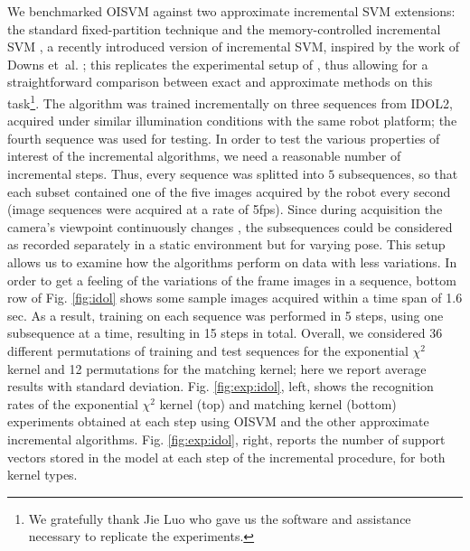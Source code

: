 We benchmarked OISVM against two approximate incremental SVM
extensions: the standard fixed-partition technique
\cite{syed99incremental} and the memory-controlled incremental SVM
\cite{pronobis:icvs06}, a recently introduced version of incremental
SVM, inspired by the work of Downs et~al. \cite{DownsGM01}; this
replicates the experimental setup of \cite{luo:icra07}, thus allowing
for a straightforward comparison between exact and approximate methods
on this task\footnote{We gratefully thank Jie Luo who gave us the
software and assistance necessary to replicate the experiments.}.  The
algorithm was trained incrementally on three sequences from IDOL2,
acquired under similar illumination conditions with the same robot
platform; the fourth sequence was used for testing. In order to test
the various properties of interest of the incremental algorithms, we
need a reasonable number of incremental steps.  Thus, every sequence
was splitted into $5$ subsequences, so that each subset contained one
of the five images acquired by the robot every second (image sequences
were acquired at a rate of 5fps). Since during acquisition the
camera's viewpoint continuously changes \cite{luo:icra07}, the
subsequences could be considered as recorded separately in a static
environment but for varying pose.  This setup allows us to examine how
the algorithms perform on data with less variations. In order to get a
feeling of the variations of the frame images in a sequence, bottom
row of Fig. \ref{fig:idol} shows some sample images acquired within a
time span of 1.6 sec. As a result, training
on each sequence was performed in 5 steps, using one subsequence at a
time, resulting in 15 steps in total. Overall, we considered 36
different permutations of training and test sequences for the
exponential $\chi^2$ kernel and 12 permutations for the matching
kernel; here we report average results with standard
deviation. Fig. \ref{fig:exp:idol}, left, shows the recognition rates
of the exponential $\chi^2$ kernel (top) and matching kernel (bottom)
experiments obtained at each step using OISVM and the other
approximate incremental algorithms. Fig. \ref{fig:exp:idol}, right,
reports the number of support vectors stored in the model at each step
of the incremental procedure, for both kernel types.

